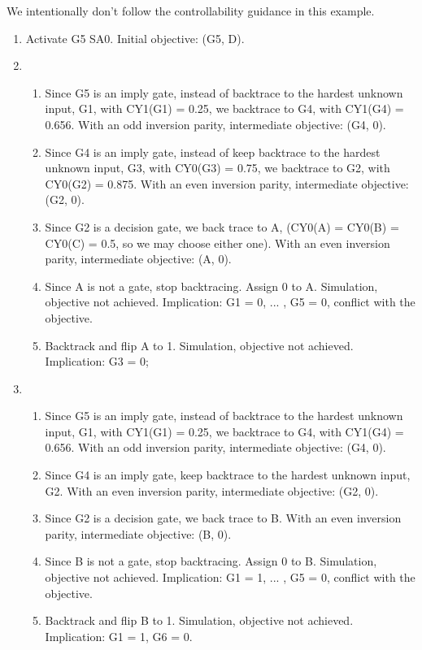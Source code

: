 We intentionally don't follow the controllability guidance in this example.

\begin{enumerate}
  \item Activate G5 SA0. Initial objective: (G5, D).
  \item {
    \begin{enumerate}
      \item Since G5 is an imply gate, instead of backtrace to the hardest unknown input, G1, with CY1(G1) = 0.25, we backtrace to G4, with CY1(G4) = 0.656. With an odd inversion parity, intermediate objective: (G4, 0).
      \item Since G4 is an imply gate, instead of keep backtrace to the hardest unknown input, G3, with CY0(G3) = 0.75, we backtrace to G2, with CY0(G2) = 0.875. With an even inversion parity, intermediate objective: (G2, 0).
      \item Since G2 is a decision gate, we back trace to A, (CY0(A) = CY0(B) = CY0(C) = 0.5, so we may choose either one). With an even inversion parity, intermediate objective: (A, 0).
      \item Since A is not a gate, stop backtracing. Assign 0 to A. Simulation, objective not achieved. Implication: G1 = 0, ... , G5 = 0, conflict with the objective.
      \item Backtrack and flip A to 1. Simulation, objective not achieved. Implication: G3 = 0;
    \end{enumerate}
  }
  \item {
    \begin{enumerate}
      \item Since G5 is an imply gate, instead of backtrace to the hardest unknown input, G1, with CY1(G1) = 0.25, we backtrace to G4, with CY1(G4) = 0.656. With an odd inversion parity, intermediate objective: (G4, 0).
      \item Since G4 is an imply gate, keep backtrace to the hardest unknown input, G2. With an even inversion parity, intermediate objective: (G2, 0).
      \item Since G2 is a decision gate, we back trace to B. With an even inversion parity, intermediate objective: (B, 0).
      \item Since B is not a gate, stop backtracing. Assign 0 to B. Simulation, objective not achieved. Implication: G1 = 1, ... , G5 = 0, conflict with the objective.
      \item Backtrack and flip B to 1. Simulation, objective not achieved. Implication: G1 = 1, G6 = 0.

\end{enumerate}}
\end{enumerate}
